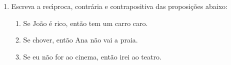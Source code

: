 \documentclass[a4paper,5pt]{amsbook}
\begin{document}
\begin{enumerate}
    \vspace{0.5cm}
    \item Escreva a rec\'{\i}proca, contr\'aria e contrapositiva das proposi\c{c}\~oes abaixo:
        \begin{enumerate}
            \item Se Jo\~ao \'e rico, ent\~ao tem um carro caro.
            \item Se chover, ent\~ao Ana n\~ao vai a praia.
            \item Se eu n\~ao for ao cinema, ent\~ao irei ao teatro.
        \end{enumerate}
\end{enumerate}
\end{document}
